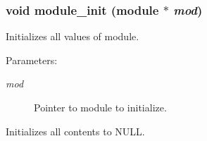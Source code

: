 \subsubsection{\setlength{\rightskip}{0pt plus 5cm}void module\_\-init ({\bf module} $\ast$ {\em mod})}\label{module_8h_a0}


Initializes all values of module.

\begin{Desc}
\item[Parameters:]
\begin{description}
\item[{\em mod}]Pointer to module to initialize.\end{description}
\end{Desc}
Initializes all contents to NULL. 
